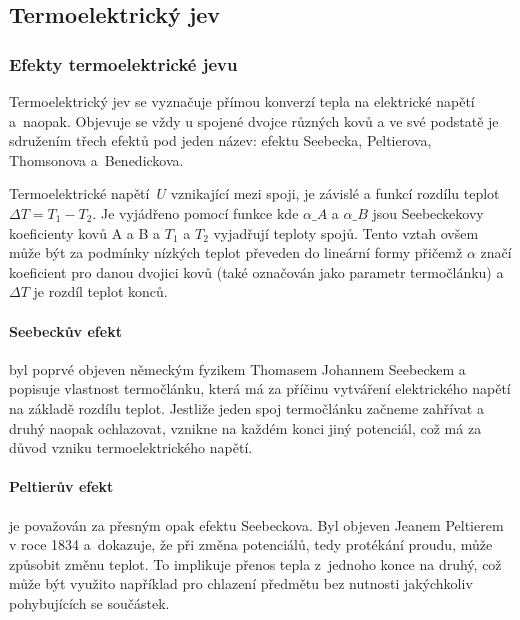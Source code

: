 \subsection{Termoelektrický jev}
\subsubsection{Efekty termoelektrické jevu}
Termoelektrický jev se vyznačuje přímou konverzí tepla na elektrické napětí
a~naopak. Objevuje se vždy u spojené dvojce různých kovů a ve své podstatě je
sdružením třech efektů pod jeden název: efektu Seebecka, Peltierova, Thomsonova
a~Benedickova.~\cite{praktikum,diplomka}

Termoelektrické napětí~$U$ vznikající mezi spoji, je závislé a funkcí rozdílu
teplot~$\Delta T = T_1 - T_2$. Je vyjádřeno pomocí funkce
kde $\alpha\_A$ a $\alpha\_B$ jsou Seebeckekovy koeficienty kovů A a B a $T_1$
a $T_2$ vyjadřují teploty spojů.  Tento vztah ovšem může být za podmínky
nízkých teplot převeden do lineární formy
přičemž $\alpha$ značí koeficient pro danou dvojici kovů (také označován jako
parametr termočlánku) a $\Delta T$ je rozdíl teplot konců.~\cite{diplomka}

\paragraph{Seebeckův efekt} byl poprvé objeven německým fyzikem Thomasem
Johannem Seebeckem a popisuje vlastnost termočlánku, která má za příčinu
vytváření elektrického napětí na základě rozdílu teplot. Jestliže jeden spoj
termočlánku začneme zahřívat a druhý naopak ochlazovat, vznikne na každém konci
jiný potenciál, což má za důvod vzniku termoelektrického
napětí.~\cite{jreichl-seebeck}

\paragraph{Peltierův efekt} je považován za přesným opak efektu Seebeckova. Byl
objeven Jeanem Peltierem v roce 1834 a~dokazuje, že při změna potenciálů, tedy
protékání proudu, může způsobit změnu teplot. To implikuje přenos tepla
z~jednoho konce na druhý, což může být využito například pro chlazení předmětu
bez nutnosti jakýchkoliv pohybujících se součástek.~\cite{peltier}

